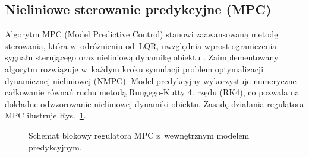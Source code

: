\subsection{Nieliniowe sterowanie predykcyjne (MPC)}

Algorytm MPC (Model Predictive Control) stanowi zaawansowaną metodę sterowania,
która w~odróżnieniu od~LQR, uwzględnia wprost ograniczenia sygnału sterującego
oraz nieliniową dynamikę obiektu \cite{Camacho2007}.
Zaimplementowany algorytm rozwiązuje w~każdym kroku symulacji problem optymalizacji dynamicznej
nieliniowej (NMPC). Model predykcyjny wykorzystuje numeryczne całkowanie równań ruchu metodą 
Rungego-Kutty 4. rzędu (RK4), co pozwala na dokładne odwzorowanie nieliniowej dynamiki obiektu. 
Zasadę działania regulatora MPC ilustruje Rys.~\ref{fig:diagram_mpc}.

\begin{figure}[H]
    \centering
    \caption{Schemat blokowy regulatora MPC z~wewnętrznym modelem predykcyjnym.}
    \label{fig:diagram_mpc}
\end{figure}

